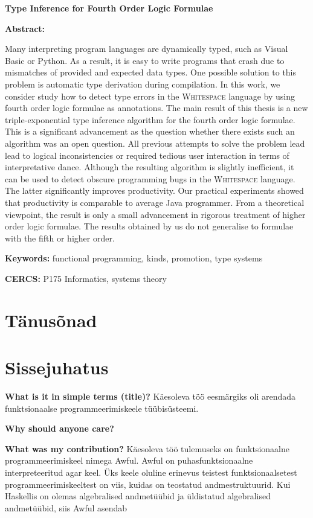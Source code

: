 \documentclass[12pt]{article}
\newcommand\peatykk[1]{
  \clearpage
  \section{#1}}
\newcommand\peatykktarn[1]{
  \clearpage
  \section*{#1}
  \addcontentsline{toc}{section}{#1}}
\newcommand\markus[1]{\textcolor{roheline}{\textbf{#1}}}
\begin{document}
{
\noindent
\textbf{\large Type Inference for Fourth Order Logic Formulae}

\vspace*{3ex}

\noindent
\textbf{Abstract:}

\noindent
Many interpreting program languages are dynamically typed, such as Visual Basic or Python. As a result, it is easy to write programs that crash due to mismatches of provided and expected data types.  One possible solution to this problem is automatic type derivation during compilation. In this work, we consider study how to detect type errors in the \textsc{Whitespace} language by using fourth order logic formulae as annotations. The main result of this thesis is a new triple-exponential type inference algorithm for the fourth order logic formulae. This is a significant advancement as the question whether there exists such an algorithm was an open question. 
All previous attempts to solve the problem lead lead to logical inconsistencies or required tedious user interaction in terms of interpretative dance. Although the resulting algorithm is slightly inefficient, it can be used to detect obscure programming bugs in the \textsc{Whitespace} language. The latter significantly improves productivity. Our practical experiments showed that productivity is comparable to average Java programmer.   
From a theoretical viewpoint, the result is only a small advancement in rigorous treatment of higher order logic formulae. The results obtained by us do not generalise to formulae with the fifth or higher order. 

\vspace*{1ex}

\noindent
\textbf{Keywords:} functional programming, kinds, promotion, type systems

\vspace*{1ex}

\noindent
\textbf{CERCS:} P175 Informatics, systems theory

\vspace*{1ex}
}
\newpage
  \tableofcontents
  \peatykktarn{Tänusõnad}
    
  \peatykk{Sissejuhatus}
    \markus{What is it in simple terms (title)?} Käesoleva töö eesmärgiks oli arendada funktsionaalse programmeerimiskeele tüübisüsteemi.

    \markus{Why should anyone care?}

    \markus{What was my contribution?} Käesoleva töö tulemuseks on funktsionaalne programmeerimiskeel nimega Awful. Awful on puhasfunktsionaalne interpreteeritud agar keel. Üks keele oluline erinevus teistest funktsionaalsetest programmeerimiskeeltest on viis, kuidas on teostatud andmestruktuurid. Kui Haskellis on olemas algebralised andmetüübid ja üldistatud algebralised andmetüübid, siis Awful asendab
\end{document}
